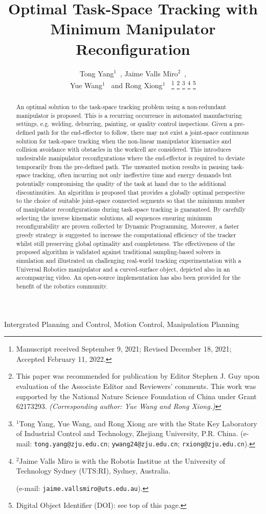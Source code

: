 \documentclass[letterpaper, 10 pt, journal, twoside]{ieeetran}  %
\title{
Optimal Task-Space Tracking with Minimum Manipulator Reconfiguration
}
\author{Tong Yang$^{1}$~\IEEEmembership{Student Member,~IEEE}, Jaime Valls Miro$^2$~\IEEEmembership{Member,~IEEE}, \\Yue Wang$^{1}$~\IEEEmembership{Member,~IEEE} and Rong Xiong$^1$~\IEEEmembership{Member,~IEEE}
\thanks{Manuscript received September 9, 2021; Revised December 18, 2021; Accepted February 11, 2022.}
\thanks{This paper was recommended for publication by Editor Stephen J. Guy upon evaluation of the Associate Editor and Reviewers' comments. 
This work was supported by the National Nature Science Foundation of China under Grant 62173293. \textit{(Corresponding author: Yue Wang and Rong Xiong.)}}
\thanks{$^1$Tong Yang, Yue Wang, and Rong Xiong are with the State Key 
Laboratory of Industrial Control and Technology, Zhejiang University, P.R. China. 
(e-mail: {\tt\footnotesize tong.yang@zju.edu.cn}; {\tt\footnotesize ywang24@zju.edu.cn}; {\tt\footnotesize rxiong@zju.edu.cn}).
}
\thanks{$^2$Jaime Valls Miro is with the Robotis Institue at the University of Technology Sydney (UTS:RI), Sydney, Australia.

(e-mail: {\tt\footnotesize jaime.vallsmiro@uts.edu.au}).}
\thanks{Digital Object Identifier (DOI): see top of this page.}
}
\begin{document}
\maketitle

\begin{abstract}
An optimal solution to the task-space tracking problem using a non-redundant manipulator is proposed. This is a recurring occurrence in automated manufacturing settings, 
e.g. welding, deburring, painting, or quality control inspections. 
Given a pre-defined path for the end-effector to follow, there may not exist a joint-space continuous solution for task-space tracking when the non-linear manipulator kinematics and collision avoidance with obstacles in the workcell are considered. This introduces undesirable manipulator reconfigurations where the end-effector is required to deviate temporarily from the pre-defined path. 
The unwanted motion results in pausing task-space tracking, often incurring not only ineffective time and energy demands but potentially compromising the quality of the task at hand due to the additional discontinuities. 
An algorithm is proposed that provides a globally optimal perspective to the choice of suitable joint-space connected segments so that the minimum number of manipulator reconfigurations during task-space tracking is guaranteed.  By carefully selecting the inverse kinematic solutions, all sequences ensuring minimum reconfigurability are proven collected by Dynamic Programming. 
Moreover, a faster greedy strategy is suggested to increase the computational efficiency of the tracker whilst still preserving global optimality and completeness. 
The effectiveness of the proposed algorithm is validated against traditional sampling-based solvers in simulation and illustrated on challenging real-world tracking experimentation with a Universal Robotics manipulator and a curved-surface object, depicted also in an accompanying video. 
An open-source implementation has also been provided for the benefit of the robotics community. 
\end{abstract}

\begin{IEEEkeywords}
Intergrated Planning and Control, Motion Control, Manipulation Planning
\end{IEEEkeywords}

\IEEEpeerreviewmaketitle

\end{document}
